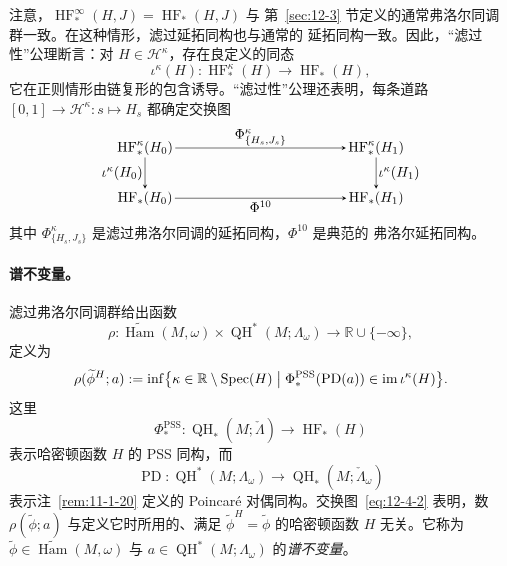 注意，$\operatorname{HF}_*^\infty(H,J)=\operatorname{HF}_*(H,J)$ 与
第~\ref{sec:12-3} 节定义的通常弗洛尔同调群一致。在这种情形，滤过延拓同构也与通常的
延拓同构一致。因此，“滤过性”公理断言：对 $H\in\mathcal H^\kappa$，存在良定义的同态
\[
  \iota^\kappa(H):\operatorname{HF}_*^\kappa(H)
  \longrightarrow\operatorname{HF}_*(H),
\]
它在正则情形由链复形的包含诱导。“滤过性”公理还表明，每条道路
$[0,1]\to\mathcal H^\kappa:s\mapsto H_s$ 都确定交换图
\begin{equation}\label{eq:12-4-2}
\begin{tikzpicture}[baseline=(current bounding box.center),>=stealth,
  every node/.style={inner sep=1.5pt}]
  \node (a) at (0,1.25) {$\operatorname{HF}_*^\kappa(H_0)$};
  \node (b) at (5.8,1.25) {$\operatorname{HF}_*^\kappa(H_1)$};
  \node (c) at (0,0) {$\operatorname{HF}_*(H_0)$};
  \node (d) at (5.8,0) {$\operatorname{HF}_*(H_1)$};
  \draw[->] (a) -- node[above] {$\Phi^\kappa_{\{H_s,J_s\}}$} (b);
  \draw[->] (a) -- node[left] {$\iota^\kappa(H_0)$} (c);
  \draw[->] (b) -- node[right] {$\iota^\kappa(H_1)$} (d);
  \draw[->] (c) -- node[below] {$\Phi^{10}$} (d);
\end{tikzpicture}
\end{equation}
其中 $\Phi^\kappa_{\{H_s,J_s\}}$ 是滤过弗洛尔同调的延拓同构，$\Phi^{10}$ 是典范的
弗洛尔延拓同构。

\paragraph{谱不变量。}
滤过弗洛尔同调群给出函数
\[
  \rho:\widetilde{\operatorname{Ham}}(M,\omega)
  \times\operatorname{QH}^*(M;\Lambda_\omega)
  \longrightarrow\mathbb R\cup\{-\infty\},
\]
定义为
\begin{equation}\label{eq:12-4-3}
  \rho(\widetilde\phi^H;a)
  :=\inf\bigl\{\kappa\in\mathbb R\setminus\operatorname{Spec}(H)
  \bigm|\Phi_*^{\mathrm{PSS}}(\operatorname{PD}(a))
  \in\operatorname{im}\iota^\kappa(H)\bigr\}.
\end{equation}
这里
\[
  \Phi_*^{\mathrm{PSS}}:
  \operatorname{QH}_*(M;\check\Lambda)
  \longrightarrow\operatorname{HF}_*(H)
\]
表示哈密顿函数 $H$ 的 PSS 同构，而
\[
  \operatorname{PD}:\operatorname{QH}^*(M;\Lambda_\omega)
  \longrightarrow\operatorname{QH}_*(M;\check\Lambda_\omega)
\]
表示注~\ref{rem:11-1-20} 定义的 Poincaré 对偶同构。交换图~\eqref{eq:12-4-2}
表明，数 $\rho(\widetilde\phi;a)$ 与定义它时所用的、满足
$\widetilde\phi^H=\widetilde\phi$ 的哈密顿函数 $H$ 无关。它称为
$\widetilde\phi\in\widetilde{\operatorname{Ham}}(M,\omega)$ 与
$a\in\operatorname{QH}^*(M;\Lambda_\omega)$ 的\emph{谱不变量}。


